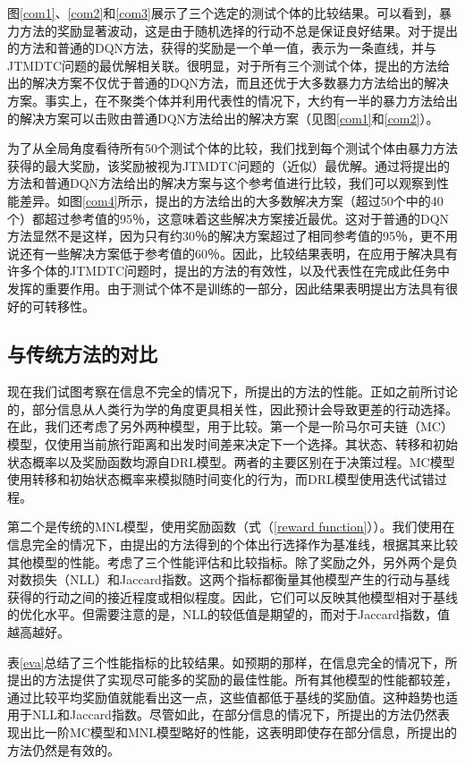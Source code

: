 图\ref{com1}、\ref{com2}和\ref{com3}展示了三个选定的测试个体的比较结果。可以看到，暴力方法的奖励显著波动，这是由于随机选择的行动不总是保证良好结果。对于提出的方法和普通的DQN方法，获得的奖励是一个单一值，表示为一条直线，并与JTMDTC问题的最优解相关联。很明显，对于所有三个测试个体，提出的方法给出的解决方案不仅优于普通的DQN方法，而且还优于大多数暴力方法给出的解决方案。事实上，在不聚类个体并利用代表性的情况下，大约有一半的暴力方法给出的解决方案可以击败由普通DQN方法给出的解决方案（见图\ref{com1}和\ref{com2}）。

为了从全局角度看待所有50个测试个体的比较，我们找到每个测试个体由暴力方法获得的最大奖励，该奖励被视为JTMDTC问题的（近似）最优解。通过将提出的方法和普通DQN方法给出的解决方案与这个参考值进行比较，我们可以观察到性能差异。如图\ref{com4}所示，提出的方法给出的大多数解决方案（超过50个中的40个）都超过参考值的95％，这意味着这些解决方案接近最优。这对于普通的DQN方法显然不是这样，因为只有约30％的解决方案超过了相同参考值的95％，更不用说还有一些解决方案低于参考值的60％。因此，比较结果表明，在应用于解决具有许多个体的JTMDTC问题时，提出的方法的有效性，以及代表性在完成此任务中发挥的重要作用。由于测试个体不是训练的一部分，因此结果表明提出方法具有很好的可转移性。

\subsection{与传统方法的对比}

现在我们试图考察在信息不完全的情况下，所提出的方法的性能。正如之前所讨论的，部分信息从人类行为学的角度更具相关性，因此预计会导致更差的行动选择。在此，我们还考虑了另外两种模型，用于比较。第一个是一阶马尔可夫链（MC）模型，仅使用当前旅行距离和出发时间差来决定下一个选择。其状态、转移和初始状态概率以及奖励函数均源自DRL模型。两者的主要区别在于决策过程。MC模型使用转移和初始状态概率来模拟随时间变化的行为，而DRL模型使用迭代试错过程。

第二个是传统的MNL模型，使用奖励函数（式（\ref{reward function}））。我们使用在信息完全的情况下，由提出的方法得到的个体出行选择作为基准线，根据其来比较其他模型的性能。考虑了三个性能评估和比较指标。除了奖励之外，另外两个是负对数损失（NLL）和Jaccard指数。这两个指标都衡量其他模型产生的行动与基线获得的行动之间的接近程度或相似程度。因此，它们可以反映其他模型相对于基线的优化水平。但需要注意的是，NLL的较低值是期望的，而对于Jaccard指数，值越高越好。

表\ref{eva}总结了三个性能指标的比较结果。如预期的那样，在信息完全的情况下，所提出的方法提供了实现尽可能多的奖励的最佳性能。所有其他模型的性能都较差，通过比较平均奖励值就能看出这一点，这些值都低于基线的奖励值。这种趋势也适用于NLL和Jaccard指数。尽管如此，在部分信息的情况下，所提出的方法仍然表现出比一阶MC模型和MNL模型略好的性能，这表明即使存在部分信息，所提出的方法仍然是有效的。

